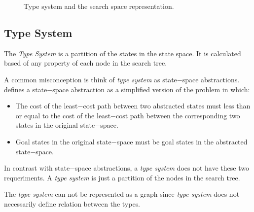 \begin{figure}[htb]
\caption{Type system and the search space representation.} \label{fig:ss_ts}
\end{figure}

\subsection{Type System}
The \textit{Type System} is a partition of the states in the state space. It is calculated based of any property of each node in the search tree. \cite{Lelis2013CC}

A common misconception is think of \textit{type system} as state$-$space abstractions. \cite{Prieditis93} defines a state$-$space abstraction as a simplified version of the problem in which:
\begin{itemize}
\item The cost of the least$-$cost path between two abstracted states must less than or equal to the cost of the least$-$cost path between the corresponding two states in the original state$-$space.
\item Goal states in the original state$-$space must be goal states in the abstracted state$-$space.
\end{itemize}

In contrast with state$-$space abstractions, a \textit{type system} does not have these two requeriments. A \textit{type system} is just a partition of the nodes in the search tree.

The \textit{type system} can not be represented as a graph since \textit{type system} does not necessarily define relation between the types.

